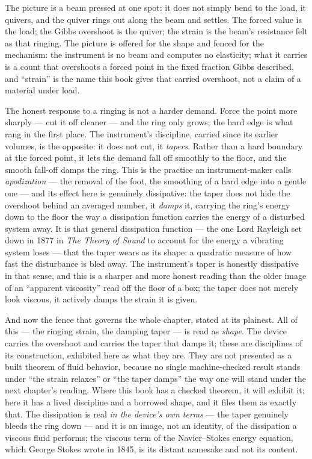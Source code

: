 \begin{intuition}
The picture is a beam pressed at one spot: it does not simply bend to the load,
it quivers, and the quiver rings out along the beam and settles. The forced
value is the load; the Gibbs overshoot is the quiver; the strain is the beam's
resistance felt as that ringing. The picture is offered for the shape and fenced
for the mechanism: the instrument is no beam and computes no elasticity; what it
carries is a count that overshoots a forced point in the fixed fraction Gibbs
described, and ``strain'' is the name this book gives that carried overshoot, not
a claim of a material under load.
\end{intuition}

The honest response to a ringing is not a harder demand. Force the point more
sharply --- cut it off cleaner --- and the ring only grows; the hard edge is what
rang in the first place. The instrument's discipline, carried since its earlier
volumes, is the opposite: it does not cut, it \emph{tapers}. Rather than a hard
boundary at the forced point, it lets the demand fall off smoothly to the floor,
and the smooth fall-off damps the ring. This is the practice an instrument-maker
calls \emph{apodization} --- the removal of the foot, the smoothing of a hard
edge into a gentle one --- and its effect here is genuinely dissipative: the
taper does not hide the overshoot behind an averaged number, it \emph{damps} it,
carrying the ring's energy down to the floor the way a dissipation function
carries the energy of a disturbed system away. It is that general dissipation
function --- the one Lord Rayleigh set down in 1877 in \emph{The Theory of
Sound} to account for the energy a vibrating system loses --- that the taper
wears as its shape: a quadratic measure of how fast the disturbance is bled
away. The instrument's taper is honestly dissipative in that sense, and this is a
sharper and more honest reading than the older image of an ``apparent
viscosity'' read off the floor of a box; the taper does not merely look
viscous, it actively damps the strain it is given.

And now the fence that governs the whole chapter, stated at its plainest. All of
this --- the ringing strain, the damping taper --- is read as \emph{shape}. The
device carries the overshoot and carries the taper that damps it; these are
disciplines of its construction, exhibited here as what they are. They are not
presented as a built theorem of fluid behavior, because no single machine-checked
result stands under ``the strain relaxes'' or ``the taper damps'' the way one
will stand under the next chapter's reading. Where this book has a checked
theorem, it will exhibit it; here it has a lived discipline and a borrowed shape,
and it files them as exactly that. The dissipation is real \emph{in the device's
own terms} --- the taper genuinely bleeds the ring down --- and it is an image,
not an identity, of the dissipation a viscous fluid performs; the viscous term of
the Navier--Stokes energy equation, which George Stokes wrote in 1845, is its
distant namesake and not its content.


